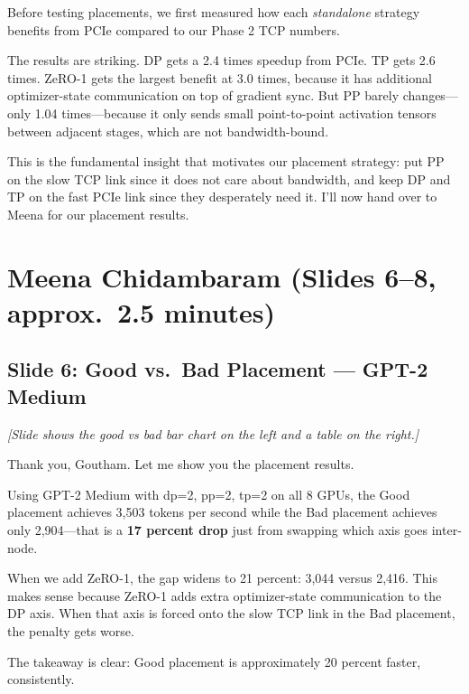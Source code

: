 \documentclass[11pt, a4paper]{article}
\begin{document}
Before testing placements, we first measured how each \textit{standalone} strategy benefits from PCIe compared to our Phase 2 TCP numbers.

The results are striking. DP gets a 2.4 times speedup from PCIe. TP gets 2.6 times. ZeRO-1 gets the largest benefit at 3.0 times, because it has additional optimizer-state communication on top of gradient sync. But PP barely changes---only 1.04 times---because it only sends small point-to-point activation tensors between adjacent stages, which are not bandwidth-bound.

This is the fundamental insight that motivates our placement strategy: put PP on the slow TCP link since it does not care about bandwidth, and keep DP and TP on the fast PCIe link since they desperately need it. I'll now hand over to Meena for our placement results.

\section{Meena Chidambaram (Slides 6--8, approx.\ 2.5 minutes)}

\subsection{Slide 6: Good vs.\ Bad Placement --- GPT-2 Medium}
\textit{[Slide shows the good vs bad bar chart on the left and a table on the right.]}

Thank you, Goutham. Let me show you the placement results.

Using GPT-2 Medium with dp=2, pp=2, tp=2 on all 8 GPUs, the Good placement achieves 3,503 tokens per second while the Bad placement achieves only 2,904---that is a \textbf{17 percent drop} just from swapping which axis goes inter-node.

When we add ZeRO-1, the gap widens to 21 percent: 3,044 versus 2,416. This makes sense because ZeRO-1 adds extra optimizer-state communication to the DP axis. When that axis is forced onto the slow TCP link in the Bad placement, the penalty gets worse.

The takeaway is clear: Good placement is approximately 20 percent faster, consistently.
\end{document}
